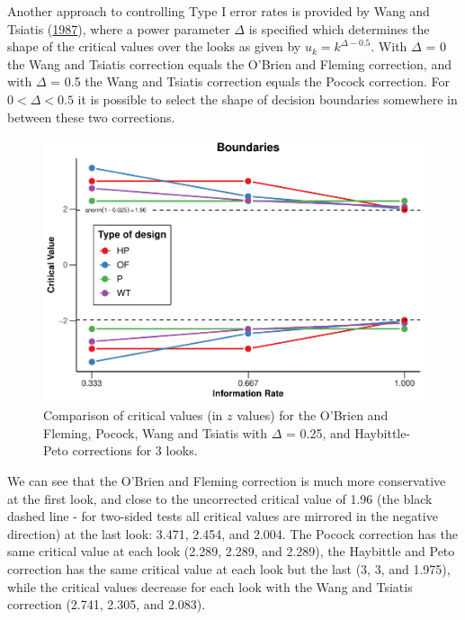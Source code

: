 \documentclass[
  english,
  ,jou, a4paper,floatsintext]{apa6}
\begin{document}
Another approach to controlling Type I error rates is provided by Wang and Tsiatis (\protect\hyperlink{ref-wang_approximately_1987}{1987}), where a power parameter \(\Delta\) is specified which determines the shape of the critical values over the looks as given by \(u_k = k^{\Delta - 0.5}\). With \(\Delta\) = 0 the Wang and Tsiatis correction equals the O'Brien and Fleming correction, and with \(\Delta\) = 0.5 the Wang and Tsiatis correction equals the Pocock correction. For \(0 < \Delta < 0.5\) it is possible to select the shape of decision boundaries somewhere in between these two corrections.

\begin{figure}
\centering
\includegraphics{sequential_tutorial_files/figure-latex/spending-comparison-1.pdf}
\caption{\label{fig:spending-comparison}Comparison of critical values (in \(z\) values) for the O'Brien and Fleming, Pocock, Wang and Tsiatis with \(\Delta\) = 0.25, and Haybittle-Peto corrections for 3 looks.}
\end{figure}

We can see that the O'Brien and Fleming correction is much more conservative at the first look, and close to the uncorrected critical value of 1.96 (the black dashed line - for two-sided tests all critical values are mirrored in the negative direction) at the last look: 3.471, 2.454, and 2.004. The Pocock correction has the same critical value at each look (2.289, 2.289, and 2.289), the Haybittle and Peto correction has the same critical value at each look but the last (3, 3, and 1.975), while the critical values decrease for each look with the Wang and Tsiatis correction (2.741, 2.305, and 2.083).
\end{document}
